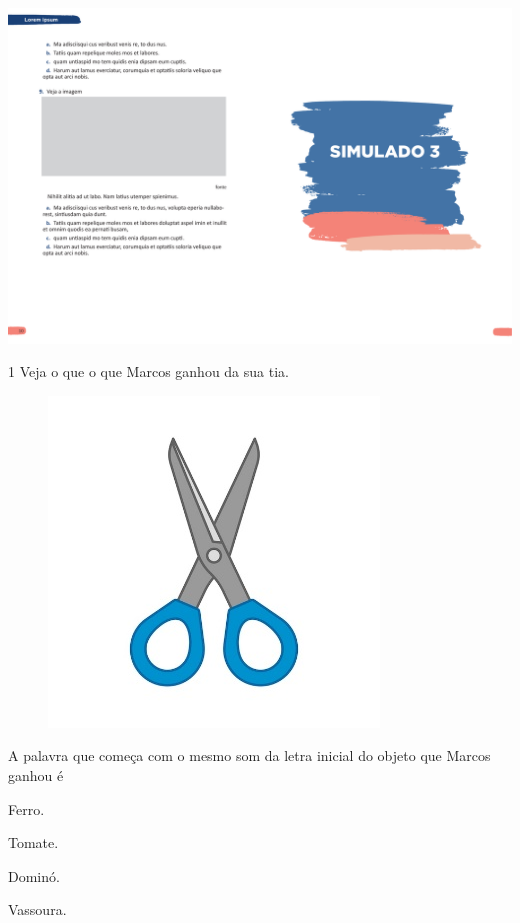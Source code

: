 \vspace*{-3.4cm}
\hspace*{-3.7cm}\includegraphics[scale=1]{../watermarks/3simulado5ano.pdf}

\num{1} Veja o que o que Marcos ganhou da sua tia.

\begin{figure}[htpb!]
\centering
\includegraphics[width=.5\textwidth]{media/image163.jpeg}
\end{figure}


A palavra que começa com o mesmo som da letra inicial do objeto que
Marcos ganhou é

\begin{escolha}
\item Ferro.

\item Tomate.

\item Dominó.

\item Vassoura.
\end{escolha}

